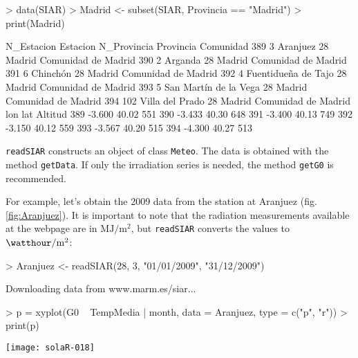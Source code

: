 \documentclass[oldfontcommands,a4paper]{memoir}
\makeatletter
\renewenvironment{figure}[1][]{%
     	\@float{figure}%
		\precaption{\rule{\linewidth}{0.4pt}\par}%
		\centering
		  }{%
    	\end@float	
}
\renewenvironment{Schunk}{\vspace{\topsep}}{\vspace{\topsep}}
\makeatother
\begin{document}
\begin{Schunk}
\begin{Sinput}
> data(SIAR)
> Madrid <- subset(SIAR, Provincia == "Madrid")
> print(Madrid)
\end{Sinput}
\begin{Soutput}
    N_Estacion              Estacion N_Provincia Provincia           Comunidad
389          3              Aranjuez          28    Madrid Comunidad de Madrid
390          2               Arganda          28    Madrid Comunidad de Madrid
391          6              Chinchón          28    Madrid Comunidad de Madrid
392          4   Fuentidueña de Tajo          28    Madrid Comunidad de Madrid
393          5 San Martín de la Vega          28    Madrid Comunidad de Madrid
394        102       Villa del Prado          28    Madrid Comunidad de Madrid
       lon   lat Altitud
389 -3.600 40.02     551
390 -3.433 40.30     648
391 -3.400 40.13     749
392 -3.150 40.12     559
393 -3.567 40.20     515
394 -4.300 40.27     513
\end{Soutput}
\end{Schunk}

\texttt{readSIAR} constructs an object of class \texttt{Meteo}. The data is obtained with 
the method \texttt{getData}.  If only the irradiation series is needed, the method  \texttt{getG0} 
is recommended.

For example, let's obtain the 2009 data from the station at Aranjuez (fig. \ref{fig:Aranjuez}). 
It is important to note that the radiation measurements available at the webpage are
in  $\si{\mega\joule\per\meter\squared}$, but \texttt{readSIAR} converts the values to $\si{\watthour\per\meter\squared}$:

\begin{Schunk}
\begin{Sinput}
> Aranjuez <- readSIAR(28, 3, "01/01/2009", "31/12/2009")
\end{Sinput}
\begin{Soutput}
Downloading data from www.marm.es/siar...
\end{Soutput}
\end{Schunk}

\begin{figure}
  \centering
\begin{Schunk}
\begin{Sinput}
> p = xyplot(G0 ~ TempMedia | month, data = Aranjuez, type = c("p", 
     "r"))
> print(p)
\end{Sinput}
\end{Schunk}
\texttt{[image: solaR-018]}
  \caption{Daily irradiation and mean temperature in the station of Aranjuez.}
  \label{fig:Aranjuez}
\end{figure}
\end{document}
